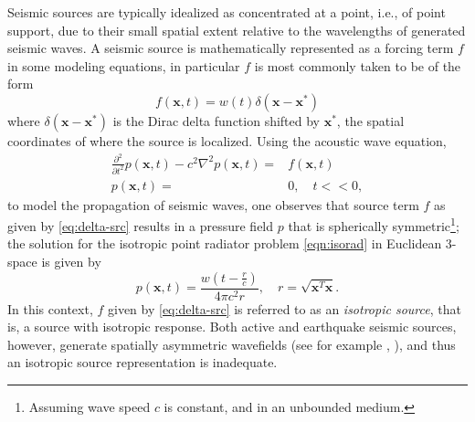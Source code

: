 Seismic sources are typically idealized as concentrated at a point, i.e., of point support, due to their small spatial extent relative to the wavelengths of generated seismic waves.
A seismic source is mathematically represented as a forcing term $f$ in some modeling equations, in particular $f$ is most commonly taken to be of the form
\begin{equation}
\label{eq:delta-src}
	f(\mathbf x,t) = w(t)\delta(\mathbf x-\mathbf x^*)
\end{equation}
where $\delta(\mathbf x-\mathbf x^*)$ is the Dirac delta function shifted by $\mathbf x^*$, the spatial coordinates of where the source is localized.
Using the acoustic wave equation,
\begin{equation}
\label{eqn:isorad}
\begin{split}
        \frac{\partial^2}{\partial t^2} p(\mathbf x,t) - c^2\nabla^2
  	p(\mathbf x,t) =& f(\mathbf x,t)\\
	p(\mathbf x,t) = & 0,  \quad t<<0,
\end{split}
\end{equation}
to model the propagation of seismic waves, one observes that source term $f$ as given by \ref{eq:delta-src} results in a pressure field $p$ that is spherically symmetric\footnote{Assuming wave speed $c$ is constant, and in an unbounded medium.}; the solution for the isotropic point radiator problem \ref{eqn:isorad} in Euclidean 3-space \cite[]{CourHil:62} is given by
\begin{equation}
\label{eq:green3d}
	p(\mathbf x,t) = \frac{w\left(t-\frac{r}{c}\right)}{4\pi c^2 r},
	\quad r = \sqrt{\mathbf x^T \mathbf x}.
\end{equation}
In this context, $f$ given by \ref{eq:delta-src} is referred to as an {\em isotropic source}, that is, a source with isotropic response. 
Both active and earthquake seismic sources, however, generate spatially asymmetric wavefields (see for example \cite{Shearer:2009}, \cite{Yil:01}), and thus an isotropic source representation is inadequate.

